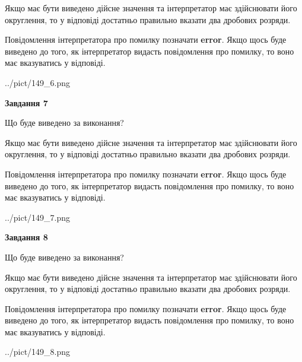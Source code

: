 \documentclass[12pt, ukrainian]{article}
\begin{document}
{\begin {Large}
Якщо має бути виведено дійсне значення та інтерпретатор має здійснювати його округлення, 
то у відповіді достатньо правильно вказати два дробових розряди.

Повідомлення інтерпретатора про помилку позначати \textbf{error}.
Якщо щось буде виведено до того, як інтерпретатор видасть повідомлення про помилку, 
то воно має вказуватись у відповіді. \par

\begin{center}
	{../pict/149_6.png}
\end{center}
\newpage

{\begin {center}\textbf{Завдання 7}\end {center}}\par
Що буде виведено за виконання? \par

Якщо має бути виведено дійсне значення та інтерпретатор має здійснювати його округлення, 
то у відповіді достатньо правильно вказати два дробових розряди.

Повідомлення інтерпретатора про помилку позначати \textbf{error}.
Якщо щось буде виведено до того, як інтерпретатор видасть повідомлення про помилку, 
то воно має вказуватись у відповіді. \par

\begin{center}
	{../pict/149_7.png}
\end{center}
\newpage

{\begin {center}\textbf{Завдання 8}\end {center}}\par
Що буде виведено за виконання? \par

Якщо має бути виведено дійсне значення та інтерпретатор має здійснювати його округлення, 
то у відповіді достатньо правильно вказати два дробових розряди.

Повідомлення інтерпретатора про помилку позначати \textbf{error}.
Якщо щось буде виведено до того, як інтерпретатор видасть повідомлення про помилку, 
то воно має вказуватись у відповіді. \par

\begin{center}
	{../pict/149_8.png}
\end{center}
\newpage


\end{Large}}
\end{document}

